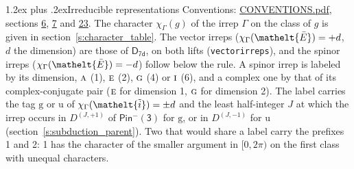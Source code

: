 \documentclass[10pt,a4paper]{article}
\makeatletter
\renewcommand\section{\@startsection{section}{1}{\z@}{-3ex plus -1ex minus -.2ex}%
  {1.2ex plus .2ex}{\normalfont\large\sffamily\bfseries\color{parttitle}}}
\numberwithin{equation}{section}
\newcommand{\eltfont}[1]{{\let\sigma\eltsigma\mathelt{#1}}}
\newcommand{\grp}[1]{\mathsf{#1}}
\newcommand{\irr}[1]{\text{\normalfont\scshape #1}}
\newcommand{\elt}[1]{\eltfont{#1}}
\newcommand{\ptag}[1]{\mathrm{#1}}
\newcommand{\irrJp}[2]{D^{(#1,#2)}}
\newcommand{\irchar}[1]{\chi_{#1}}
\newcommand{\barred}[1]{\bar{#1}}
\newcommand{\lift}[1]{\tilde{#1}}
\makeatother
\begin{document}
\section{Irreducible representations}\label{s:irreps}
Conventions: \href{../../CONVENTIONS.pdf}{CONVENTIONS.pdf}, sections \href{../../../rotation/CONVENTIONS.pdf\#conv.6}{6}, \href{../../../rotation/CONVENTIONS.pdf\#conv.7}{7} and \href{../../CONVENTIONS.pdf\#conv.23}{23}.
\leavevmode\label{n:function.character}\label{n:irrep.Gamma}The character $\irchar{\Gamma}(g)$ of the irrep $\Gamma$ on the class of $g$ is given in section~\ref{s:character_table}. \label{n:index.dimension}The vector irreps ($\irchar{\Gamma}(\elt{\barred{E}}) = +d$, $d$ the dimension) are those of \href{../../../rotation/data/pdf/D7d.pdf}{$\grp{D_{7d}}$}, on both lifts (\texttt{vectorirreps}), and the spinor irreps ($\irchar{\Gamma}(\elt{\barred{E}}) = -d$) follow below the rule. A spinor irrep is labeled by its dimension, $\irr{a}$ (1), $\irr{e}$ (2), $\irr{g}$ (4) or $\irr{i}$ (6), and a complex one by that of its complex-conjugate pair ($\irr{e}$ for dimension 1, $\irr{g}$ for dimension 2). The label carries the tag $\ptag{g}$ or $\ptag{u}$ of $\irchar{\Gamma}(\elt{\lift{i}}) = \pm d$ and the least half-integer $J$ at which the irrep occurs in $\irrJp{J}{+1}$ of $\grp{Pin^{-}(3)}$ for $\ptag{g}$, or in $\irrJp{J}{-1}$ for $\ptag{u}$ (section~\ref{s:subduction_parent}). Two that would share a label carry the prefixes 1 and 2: 1 has the character of the smaller argument in $[0, 2\pi)$ on the first class with unequal characters.
\end{document}
